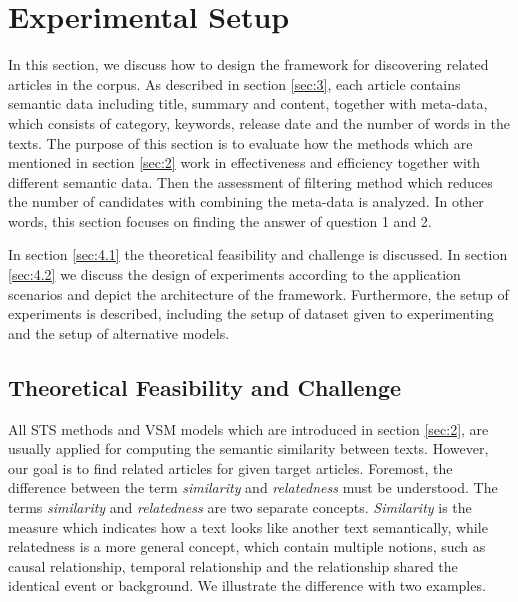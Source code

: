 \section{Experimental Setup}
\label{sec:4}
In this section, we discuss how to design the framework for discovering related articles in the corpus. As described in section \ref{sec:3}, each article contains semantic data including title, summary and content, together with meta-data, which consists of category, keywords, release date and the number of words in the texts. The purpose of this section is to evaluate how the methods which are mentioned in section \ref{sec:2} work in effectiveness and efficiency together with different semantic data. Then the assessment of filtering method which reduces the number of candidates with combining the meta-data is analyzed. In other words, this section focuses on finding the answer of question 1 and 2.

In section \ref{sec:4.1} the theoretical feasibility and challenge is discussed. In section \ref{sec:4.2} we discuss the design of experiments according to the application scenarios and depict the architecture of the framework. Furthermore, the setup of experiments is described, including the setup of dataset given to experimenting and the setup of alternative models. 

\subsection{Theoretical Feasibility and Challenge}

All STS methods and VSM models which are introduced in section \ref{sec:2}, are usually applied for computing the semantic similarity between texts. However, our goal is to find related articles for given target articles. Foremost, the difference between the term \textit{similarity} and \textit{relatedness} must be understood. The terms \textit{similarity} and \textit{relatedness} are two separate concepts\cite{pedersen2007measures}. \textit{Similarity} is the measure which indicates how a text looks like another text semantically, while relatedness is a more general concept, which contain multiple notions, such as causal relationship, temporal relationship and the relationship shared the identical event or background. We illustrate the difference with two examples. 


